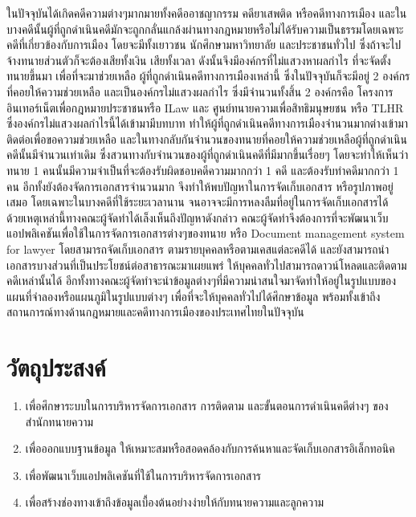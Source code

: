 \documentclass[12pt,oneside,openright,a4paper]{cpe-thai-project}
\begin{document}
\hspace*{1cm} ในปัจจุบันได้เกิดคดีความต่างๆมากมายทั้งคดีออาชญากรรม คดียาเสพติด หรือคดีทางการเมือง และในบางคดีนั้นผู้ที่ถูกดำเนินคดีมักจะถูกกลั่นแกล้งผ่านทางกฎหมายหรือไม่ได้รับความเป็นธรรมโดยเฉพาะคดีที่เกี่ยวข้องกับการเมือง โดยจะมีทั้งเยาวชน นักศึกษามหาวิทยาลัย และประชาชนทั่วไป ซึ่งถ้าจะไปจ้างทนายส่วนตัวก็จะต้องเสียทั้งเงิน เสียทั้งเวลา ดังนั้นจึงมีองค์กรที่ไม่แสวงหาผลกำไร ที่จะจัดตั้งทนายขึ้นมา เพื่อที่จะมาช่วยเหลือ ผู้ที่ถูกดำเนินคดีทางการเมืองเหล่านี้ ซึ่งในปัจจุบันก็จะมีอยู่ 2 องค์กรที่คอยให้ความช่วยเหลือ และเป็นองค์กรไม่แสวงผลกำไร ซึ่งมีจำนวนทั้งสิ้น 2 องค์กรคือ โครงการอินเทอร์เน็ตเพื่อกฎหมายประชาชนหรือ ILaw และ ศูนย์ทนายความเพื่อสิทธิมนุษยชน หรือ TLHR ซึ่งองค์กรไม่แสวงผลกำไรนี้ได้เข้ามามีบทบาท ทำให้ผู้ที่ถูกดำเนินคดีทางการเมืองจำนวนมากต่างเข้ามาติดต่อเพื่อขอความช่วยเหลือ และในทางกลับกันจำนวนของทนายที่คอยให้ความช่วยเหลือผู้ที่ถูกดำเนินคดีนั้นมีจำนวนเท่าเดิม ซึ่งสวนทางกับจำนวนของผู้ที่ถูกดำเนินคดีที่มีมากขึ้นเรื่อยๆ โดยจะทำให้เห็นว่าทนาย 1 คนนั้นมีความจำเป็นที่จะต้องรับผิดชอบคดีความมากกว่า 1 คดี และต้องรับทำคดีมากกว่า 1 คน อีกทั้งยังต้องจัดการเอกสารจำนวนมาก จึงทำให้พบปัญหาในการจัดเก็บเอกสาร หรือรูปภาพอยู่เสมอ โดยเฉพาะในบางคดีที่ใช้ระยะเวลานาน จนอาจจะมีการหลงลืมที่อยู่ในการจัดเก็บเอกสารได้ \\
\hspace*{1cm} ด้วยเหตุเหล่านี้ทางคณะผู้จัดทำได้เล็งเห็นถึงปัญหาดังกล่าว คณะผู้จัดทำจึงต้องการที่จะพัฒนาเว็บแอปพลิเคชันเพื่อใช้ในการจัดการเอกสารต่างๆของทนาย หรือ Document management system for lawyer โดยสามารถจัดเก็บเอกสาร ตามรายบุคคลหรือตามเคสแต่ละคดีได้ และยังสามารถนำเอกสารบางส่วนที่เป็นประโยชน์ต่อสาธารณะมาเผยแพร่ ให้บุคคลทั่วไปสามารถดาวน์โหลดและติดตามคดีเหล่านั้นได้ อีกทั้งทางคณะผู้จัดทำจะนำข้อมูลต่างๆที่มีความน่าสนใจมาจัดทำให้อยู่ในรูปแบบของแผนที่จำลองหรือแผนภูมิในรูปแบบต่างๆ เพื่อที่จะให้บุคคลทั่วไปได้ศึกษาข้อมูล พร้อมทั้งเข้าถึงสถานการณ์ทางด้านกฎหมายและคดีทางการเมืองของประเทศไทยในปัจจุบัน

\section{วัตถุประสงค์}
\begin{enumerate}
  \item เพื่อศึกษาระบบในการบริหารจัดการเอกสาร การติดตาม และขั้นตอนการดำเนินคดีต่างๆ ของสำนักทนายความ
  \item เพื่อออกแบบฐานข้อมูล ให้เหมาะสมหรือสอดคล้องกับการค้นหาและจัดเก็บเอกสารอิเล็กทอนิค
  \item เพื่อพัฒนาเว็บแอปพลิเคชันที่ใช้ในการบริหารจัดการเอกสาร
  \item เพื่อสร้างช่องทางเข้าถึงข้อมูลเบื้องต้นอย่างง่ายให้กับทนายความและลูกความ
\end{enumerate}
\end{document}
